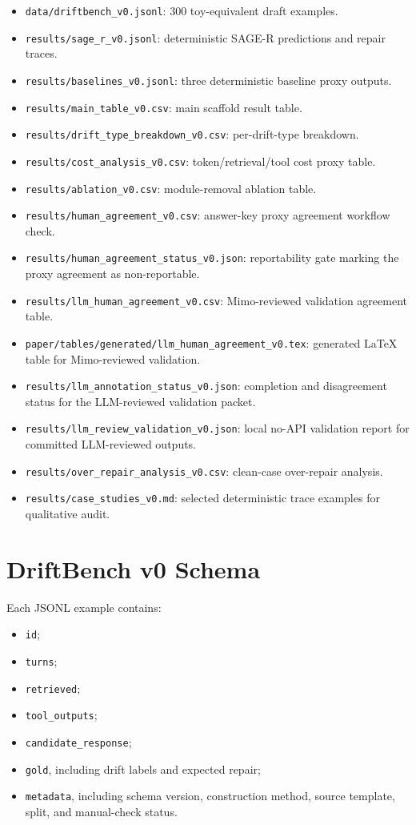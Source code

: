 \documentclass[10pt]{article}
\begin{document}
\begin{itemize}
    \item \texttt{data/driftbench\_v0.jsonl}: 300 toy-equivalent draft examples.
    \item \texttt{results/sage\_r\_v0.jsonl}: deterministic SAGE-R predictions and repair traces.
    \item \texttt{results/baselines\_v0.jsonl}: three deterministic baseline proxy outputs.
    \item \texttt{results/main\_table\_v0.csv}: main scaffold result table.
    \item \texttt{results/drift\_type\_breakdown\_v0.csv}: per-drift-type breakdown.
    \item \texttt{results/cost\_analysis\_v0.csv}: token/retrieval/tool cost proxy table.
    \item \texttt{results/ablation\_v0.csv}: module-removal ablation table.
    \item \texttt{results/human\_agreement\_v0.csv}: answer-key proxy agreement workflow check.
    \item \texttt{results/human\_agreement\_status\_v0.json}: reportability gate marking the proxy agreement as non-reportable.
    \item \texttt{results/llm\_human\_agreement\_v0.csv}: Mimo-reviewed validation agreement table.
    \item \texttt{paper/tables/generated/llm\_human\_agreement\_v0.tex}: generated LaTeX table for Mimo-reviewed validation.
    \item \texttt{results/llm\_annotation\_status\_v0.json}: completion and disagreement status for the LLM-reviewed validation packet.
    \item \texttt{results/llm\_review\_validation\_v0.json}: local no-API validation report for committed LLM-reviewed outputs.
    \item \texttt{results/over\_repair\_analysis\_v0.csv}: clean-case over-repair analysis.
    \item \texttt{results/case\_studies\_v0.md}: selected deterministic trace examples for qualitative audit.
\end{itemize}

\section{DriftBench v0 Schema}

Each JSONL example contains:

\begin{itemize}
    \item \texttt{id};
    \item \texttt{turns};
    \item \texttt{retrieved};
    \item \texttt{tool\_outputs};
    \item \texttt{candidate\_response};
    \item \texttt{gold}, including drift labels and expected repair;
    \item \texttt{metadata}, including schema version, construction method, source template, split, and manual-check status.
\end{itemize}
\end{document}
